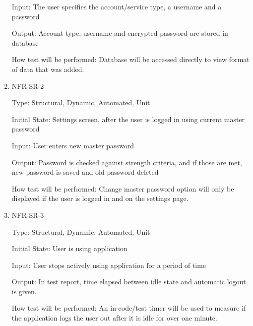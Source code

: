 \documentclass[12pt, titlepage]{article}
\begin{document}
\begin{enumerate}
Input: The user specifies the account/service type, a username and a password

Output: Account type, username and encrypted password are stored in database

How test will be performed: Database will be accessed directly to view format of data that was added.
 
\item{NFR-SR-2}

Type: Structural, Dynamic, Automated, Unit

Initial State: Settings screen, after the user is logged in using current master password

Input: User enters new master password

Output: Password is checked against strength criteria, and if those are met, new password is saved and old password deleted

How test will be performed: Change master password option will only be displayed if the user is logged in and on the settings page.

\item{NFR-SR-3}

Type: Structural, Dynamic, Automated, Unit

Initial State: User is using application

Input: User stops actively using application for a period of time

Output: In test report, time elapsed between idle state and automatic logout is given.

How test will be performed: An in-code/test timer will be used to measure if the application logs the user out after it is idle for over one minute.

\end{enumerate}
\end{document}
